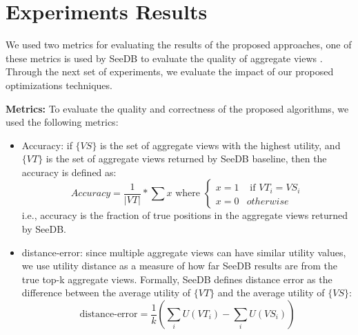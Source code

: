 \section{Experiments Results}
\label{sec:expr}
%
We used two metrics for evaluating the results of the proposed approaches, one of these metrics is used by SeeDB to evaluate the quality of aggregate views \cite{DBLP:journals/pvldb/VartakMPP14}. Through the next set of experiments, we evaluate the impact of our proposed optimizations techniques.
%

\noindent\textbf{Metrics:} To evaluate the quality and correctness of the proposed algorithms, we used the following metrics:
%
%

%
\begin{itemize}
\item Accuracy: if $\{VS\}$ is the set of aggregate views with the highest utility, and $\{VT\}$ is the 
set of aggregate views returned by SeeDB baseline, then the accuracy is defined as:
\[
Accuracy = \frac{1}{|VT|} * \sum{x}  \text{   where  }  \begin{cases}   x = 1 & \text{ if } VT_i = VS_i \\ x = 0 & otherwise \end{cases}
\]
i.e., accuracy is the fraction of true positions in the aggregate views returned by SeeDB.
%
\item distance-error: since multiple aggregate views can have similar utility values, we use utility distance as a measure of how far SeeDB results are from the true top-k aggregate views. 
%
Formally, SeeDB \cite{vartakseedb} defines distance error as the difference between the average utility of $\{VT\}$ and the average utility of $\{VS\}$:
\[
\text{distance-error} = \frac{1}{k} (\sum_{i}{ U(VT_i)} - \sum_{i}{U(VS_i)})
\]
%
\end{itemize}
%
 

